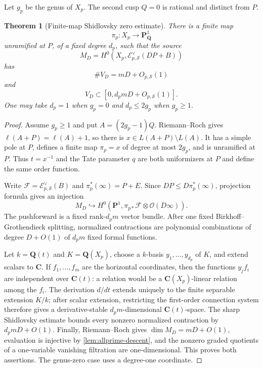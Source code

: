 \documentclass[11pt]{article}
\newtheorem{theorem}{Theorem}[section]
\theoremstyle{definition}
\theoremstyle{remark}
\newcommand{\Q}{\mathbf Q}
\newcommand{\C}{\mathbf C}
\newcommand{\calE}{\mathcal E}
\newcommand{\calF}{\mathcal F}
\newcommand{\calO}{\mathcal O}
\begin{document}
Let $g_p$ be the genus of $X_p$.  The second cusp $Q=0$ is rational and
distinct from $P$.

\begin{theorem}[Finite-map Shidlovsky zero estimate]
\label{thm:finite-map-zero}
There is a finite map
\[
 \pi_p:X_p\longrightarrow\mathbf P^1_{\Q}
\]
unramified at $P$, of a fixed degree $d_p$, such that the source
\[
 M_D=H^0\!\left(X_p,\calE_{p,\mathcal S}^{\vee}(DP+B)\right)
\]
has
\begin{equation}\label{eq:curve-pivot-count}
 \#V_D=mD+O_{p,\mathcal S}(1)
\end{equation}
and
\begin{equation}\label{eq:curve-pivot-range}
 V_D\subset[0,d_pmD+O_{p,\mathcal S}(1)].
\end{equation}
One may take $d_p=1$ when $g_p=0$ and $d_p\le2g_p$ when $g_p\ge1$.
\end{theorem}

\begin{proof}
Assume $g_p\ge1$ and put $A=(2g_p-1)Q$.  Riemann--Roch gives
$\ell(A+P)=\ell(A)+1$, so there is
$x\in L(A+P)\setminus L(A)$.  It has a simple pole at $P$, defines a finite
map $\pi_p=x$ of degree at most $2g_p$, and is unramified at $P$.  Thus
$t=x^{-1}$ and the Tate parameter $q$ are both uniformizers at $P$ and define
the same order function.

Write $\calF=\calE_{p,\mathcal S}^{\vee}(B)$ and
$\pi_p^*(\infty)=P+E$.  Since $DP\le D\pi_p^*(\infty)$, projection formula
gives an injection
\[
 M_D\hookrightarrow
 H^0\!\left(\mathbf P^1,\pi_{p*}\calF\otimes\calO(D\infty)\right).
\]
The pushforward is a fixed rank-$d_pm$ vector bundle.  After one fixed
Birkhoff--Grothendieck splitting, normalized contractions are polynomial
combinations of degree $D+O(1)$ of $d_pm$ fixed formal functions.

Let $k=\Q(t)$ and $K=\Q(X_p)$, choose a $k$-basis
$y_1,\ldots,y_{d_p}$ of $K$, and extend scalars to $\C$.  If
$f_1,\ldots,f_m$ are the horizontal coordinates, then the functions
$y_jf_i$ are independent over $\C(t)$: a relation would be a
$\C(X_p)$-linear relation among the $f_i$.  The derivation $d/dt$ extends
uniquely to the finite separable extension $K/k$; after scalar extension,
restricting the first-order connection system therefore gives a
derivative-stable $d_pm$-dimensional $\C(t)$-space.  The sharp Shidlovsky
estimate
\cite[Theorem~3.2.8]{CDT2024} bounds every nonzero normalized contraction by
$d_pmD+O(1)$.  Finally, Riemann--Roch gives
$\dim M_D=mD+O(1)$, evaluation is injective by
\cref{lem:allprime-descent}, and the nonzero graded quotients of a one-variable
vanishing filtration are one-dimensional.  This proves both assertions.  The
genus-zero case uses a degree-one coordinate.
\end{proof}
\end{document}
